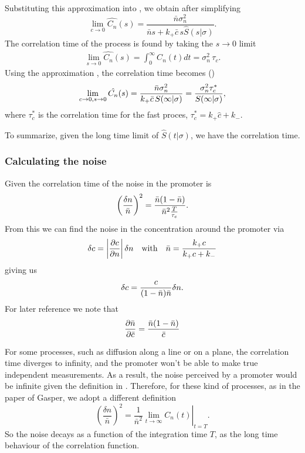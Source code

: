 Substituting this approximation into , we obtain after simplifying
\begin{equation}
 \lim_{c \rightarrow 0} \hat{C_n}(s) = \frac{\bar{n} \sigma_n^2}{\bar{n} s + k_+ \bar{c} \, s \hat{S}(s|\sigma)}.
\end{equation}
The correlation time of the process is found by taking the $s \rightarrow 0$ limit
\begin{eqnarray}
 \lim_{s \rightarrow 0} \hat{C_n}(s) = \int_0^\infty C_n(t) dt = \sigma_n^2 \, \tau_c.
\end{eqnarray}
Using the approximation , the correlation time becomes ()
\begin{equation}
 \lim_{c \rightarrow 0, s \rightarrow 0} \hat{C_n}(s) = \frac{\bar{n} \sigma_n^2}{k_+ \bar{c} \, S(\infty|\sigma)} = \frac{\sigma_n^2 \tau_c^*}{S(\infty|\sigma)},
 \elabel{CT1}
\end{equation}
where $\tau_c^*$ is the correlation time for the fast proces, $\tau_c^* = k_+ \hat{c} + k_-$.

To summarize, given the long time limit of $\hat{S}(t|\sigma)$, we have the correlation time.

\subsubsection{Calculating the noise}
Given the correlation time of the noise in the promoter is
\begin{equation}
 \left( \frac{\delta n}{\bar{n}} \right)^2 = \frac{\bar{n}(1-\bar{n})}{\bar{n}^2\frac{T}{\tau_c}}.
 \elabel{EqProNoise}
\end{equation}
From this we can find the noise in the concentration around the promoter via
\begin{equation}
 \delta c = \left|\frac{\partial c}{\partial n}\right| \delta n \quad {\rm with} \quad \bar{n} = \frac{k_+ c}{k_+ c + k_-}
\end{equation}
giving us
\begin{equation}
 \delta c = \frac{c}{(1-\bar{n})\bar{n}}\delta n.
 \elabel{EqConNoise}
\end{equation}
For later reference we note that
\begin{equation}
 \frac{\partial \bar{n}}{\partial \bar{c}} = \frac{\bar{n}(1-\bar{n})}{\bar{c}}
 \elabel{EqProNoiseII}
\end{equation}

For some processes, such as diffusion along a line or on a plane, the correlation time diverges to infinity, and the promoter won't be able to make true independent measurements. As a result, the noise perceived by a promoter would be infinite given the definition in . Therefore, for these kind of processes, as in the paper of Gasper, we adopt a different definition
\begin{equation}
  \left( \frac{\delta n}{\bar{n}} \right)^2 = \left. \frac{1}{\bar{n}^2} \lim_{t \rightarrow \infty} C_n(t)  \right|_{t = T}.
\end{equation}
So the noise decays as a function of the integration time $T$, as the long time behaviour of the correlation function.


